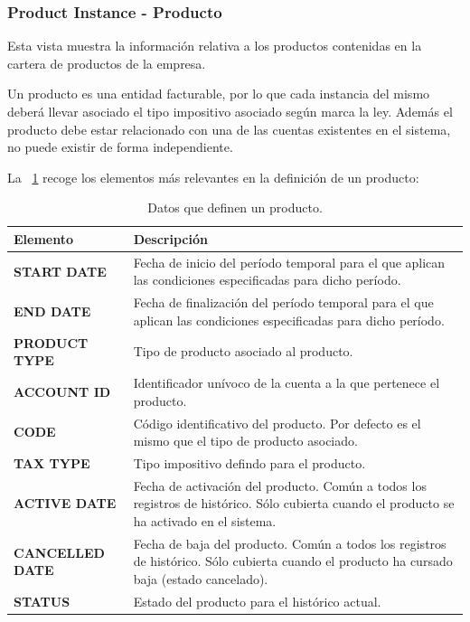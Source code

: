 \subsubsection{Product Instance - Producto}
\label{sub:product}

Esta vista muestra la información relativa a los productos contenidas en la cartera de productos de la empresa.

Un producto es una entidad facturable, por lo que cada instancia del mismo deberá llevar asociado el tipo impositivo asociado según marca la ley. Además el producto debe estar relacionado con una de las cuentas existentes en el sistema, no puede existir de forma independiente.


La \tablename~\ref{tab:producto} recoge los elementos más relevantes en la definición de un producto:

\begin{table}[H]
  \centering
  \setlength{\leftmargini}{0.4cm}
  \resizebox{14cm}{!} {
  \begin{tabular}{|m{6cm} m{8cm}|}
  \rowcolor{udcpink!25}
  \hline
  	\textbf{Elemento} & \textbf{Descripción} \\\hline
  	\textbf{START DATE} & Fecha de inicio del período temporal para el que aplican las condiciones especificadas para dicho período.\\
  	\textbf{END DATE} & Fecha de finalización del período temporal para el que aplican las condiciones especificadas para dicho período.\\
	\textbf{PRODUCT TYPE} & Tipo de producto asociado al producto.\\
	\textbf{ACCOUNT ID} & Identificador unívoco de la cuenta a la que pertenece el producto.\\
	\textbf{CODE} & Código identificativo del producto. Por defecto es el mismo que el tipo de producto asociado.\\	
	\textbf{TAX TYPE} & Tipo impositivo defindo para el producto.\\
	\textbf{ACTIVE DATE} & Fecha de activación del producto. Común a todos los registros de histórico. Sólo cubierta cuando el producto se ha activado en el sistema.\\	
	\textbf{CANCELLED DATE} & Fecha de baja del producto. Común a todos los registros de histórico. Sólo cubierta cuando el producto ha cursado baja (estado cancelado).	\\
	\textbf{STATUS} & Estado del producto para el histórico actual.	
	\\\hline
  \end{tabular}
  } %
  \caption{Datos que definen un producto.}
  \label{tab:producto}
\end{table}




